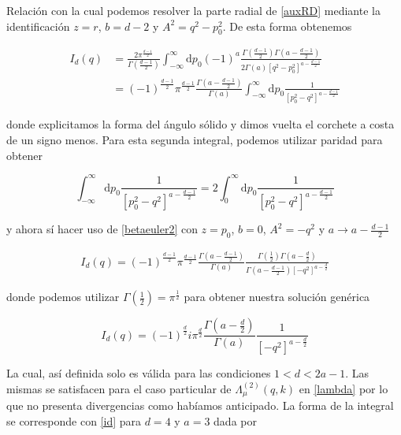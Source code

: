 \documentclass[tickz]{article}
\numberwithin{equation}{section}
\begin{document}
Relación con la cual podemos resolver la parte radial de \ref{auxRD} mediante la identificación $ z=r $, $ b= d-2 $ y $ A^2=q^2 -p_0^2 $. De esta forma obtenemos

\begin{equation}\label{key}
\begin{aligned}
I_d(q)&= \frac{2 \pi^{\frac{d-1}{2}}}{\Gamma (\frac{d-1}{2})} \int_{-\infty}^{\infty}\mathrm{d}p_0 (-1)^a \frac{\Gamma(\frac{d-1}{2} ) \Gamma(a - \frac{d-1}{2})}{2 \Gamma(a) \left[q^2 - p_0^2\right]^{a-\frac{d-1}{2}}}\\
&= (-1)^{\frac{d-1}{2}} \pi^{\frac{d-1}{2}}  \frac{\Gamma(a - \frac{d-1}{2} )}{\Gamma(a)}\int_{-\infty}^{\infty}\mathrm{d}p_0 \frac{1}{\left[p_0^2 - q^2\right]^{a-\frac{d-1}{2}}}
\end{aligned}
\end{equation}

donde explicitamos la forma del ángulo sólido y dimos vuelta el corchete a costa de un signo menos. Para esta segunda integral, podemos utilizar paridad para obtener

\begin{equation}\label{key}
\int_{-\infty}^{\infty}\mathrm{d}p_0 \frac{1}{\left[p_0^2 - q^2\right]^{a-\frac{d-1}{2}}} = 2 \int_{0}^{\infty}\mathrm{d}p_0 \frac{1}{\left[p_0^2 - q^2\right]^{a-\frac{d-1}{2}}}
\end{equation}

y ahora sí hacer uso de \ref{betaeuler2} con $ z=p_0 $, $ b= 0 $, $ A^2=-q^2$ y $ a \rightarrow a-\frac{d-1}{2} $ 

\begin{equation}\label{key}
\begin{aligned}
I_d(q)= (-1)^{\frac{d-1}{2}} \pi^{\frac{d-1}{2}}  \frac{\Gamma(a - \frac{d-1}{2} )}{\Gamma(a)} \frac{\Gamma(\frac{1}{2})\Gamma(a - \frac{d}{2} )}{\Gamma(a-\frac{d-1}{2})\left[ -q^2\right]^{a-\frac{d}{2}} }  
\end{aligned}
\end{equation}

donde podemos utilizar $ \Gamma(\frac{1}{2})= \pi^{\frac{1}{2}} $ para obtener nuestra solución genérica

\begin{equation}\label{id}
I_d(q)=(-1)^{\frac{d}{2}} i \pi^{\frac{d}{2}} \frac{\Gamma(a - \frac{d}{2} )}{\Gamma(a)} \frac{1}{\left[-q^2\right]^{a-\frac{d}{2}}}
\end{equation}


La cual, así definida solo es válida para las condiciones $ 1<d<2a-1 $. Las mismas se satisfacen para el caso particular de $ \Lambda_{\mu}^{(2)}(q,k) $ en \ref{lambda} por lo que no presenta divergencias como habíamos anticipado. La forma de la integral se corresponde con \ref{id} para $ d=4 $ y $ a=3 $ dada por
\end{document}
